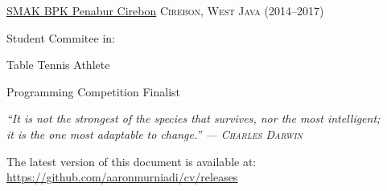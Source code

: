 \documentclass[11pt,a4paper]{article} %
\begin{document}
\headedsection %
{\href{}{SMAK BPK Penabur Cirebon}}
{\dotfill\textsc{Cirebon, West Java (2014--2017)}} {

    \headedsubsection %
    { Student Commitee in: }
    {}
    {}

    \headedsubsection %
    { Table Tennis Athlete}
    {~}
    {}

    \headedsubsection %
    { Programming Competition Finalist}
    {~}
    {}
}

\vfill

\begin{flushright}
    \textit{
        ``It is not the strongest of the species that survives, nor the most intelligent;\\it is the one most adaptable to change.'' — \textsc{Charles Darwin}}
\end{flushright}

\vfill

\vfill

{
\footnotesize\noindent
    The latest version of this document is available at:\\\href{https://github.com/aaronmurniadi/cv/releases}{https://github.com/aaronmurniadi/cv/releases}
}
\end{document}
